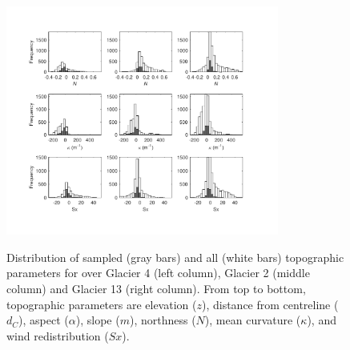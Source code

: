 \documentclass[twocolumn, letterpaper]{igs}
\begin{document}
\begin{figure}[]
\centering
	\includegraphics[width =0.8\textwidth]{TopoParamsSampled2.pdf}\\
	\caption{Distribution of sampled (gray bars) and all (white bars) topographic parameters for over Glacier 4 (left column), Glacier 2 (middle column) and Glacier 13 (right column). From top to bottom, topographic parameters are elevation ($z$), distance from centreline ($d_C$), aspect ($\alpha$), slope ($m$), northness ($N$), mean curvature ($\kappa$), and wind redistribution ($Sx$).}
	\label{fig:TopoParamsSampled2}
\end{figure}

\renewcommand{\thefigure}{\arabic{figure}}

\pagebreak

\setcounter{equation}{0}
\renewcommand\theequation{B\arabic{equation}}

\end{document}
